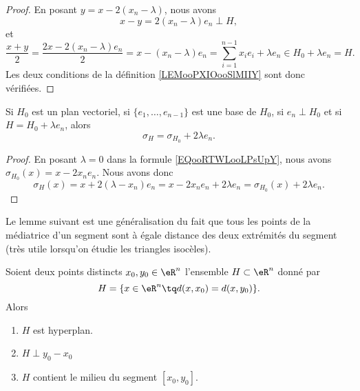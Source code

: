 \begin{proof}
	En posant \( y=x-2(x_n-\lambda)\), nous avons
	\begin{equation}
		x-y=2(x_n-\lambda)e_n\perp H,
	\end{equation}
	et
	\begin{equation}
		\frac{ x+y }{ 2 }=\frac{ 2x-2(x_n-\lambda)e_n }{ 2 }=x-(x_n-\lambda)e_n=\sum_{i=1}^{n-1}x_ie_i+\lambda e_n\in H_0+\lambda e_n=H.
	\end{equation}
	Les deux conditions de la définition \ref{LEMooPXIOooSlMIIY} sont donc vérifiées.
\end{proof}


\begin{lemma}       \label{LEMooWYVRooQmWqvM}
	Si \( H_0\) est un plan vectoriel, si \( \{ e_1,\ldots,e_{n-1} \}\) est une base de \( H_0\), si \( e_n\perp H_0\) et si \( H=H_0+\lambda e_n\), alors
	\begin{equation}
		\sigma_H=\sigma_{H_0}+2\lambda e_n.
	\end{equation}
\end{lemma}

\begin{proof}
	En posant \( \lambda=0\) dans la formule \eqref{EQooRTWLooLPsUpY}, nous avons \( \sigma_{H_0}(x)=x-2x_ne_n\). Nous avons donc
	\begin{equation}
		\sigma_H(x)=x+2(\lambda-x_n)e_n=x-2x_ne_n+2\lambda e_n=\sigma_{H_0}(x)+2\lambda e_n.
	\end{equation}
\end{proof}

Le lemme suivant est une généralisation du fait que tous les points de la médiatrice d'un segment sont à égale distance des deux extrémités du segment (très utile lorsqu'on étudie les triangles isocèles).
\begin{lemma}        \label{LEMooDPLYooJKZxiM}
	Soient deux points distincts \( x_0,y_0\in \eR^n\) l'ensemble \( H\subset \eR^n\) donné par
	\begin{equation}
		H=\{ x\in \eR^n\tq d(x,x_0)=d(x,y_0) \}.
	\end{equation}
	Alors
	\begin{enumerate}
		\item
		      \( H\) est hyperplan.
		\item
		      \( H\perp  y_0-x_0\)
		\item
		      \( H\) contient le milieu du segment \( [x_0,y_0]\).
	\end{enumerate}
\end{lemma}

